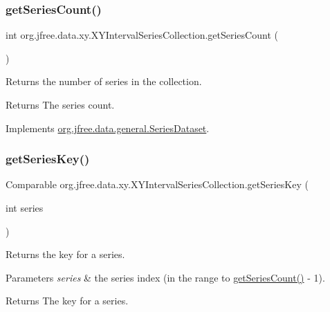 \subsubsection{\texorpdfstring{get\+Series\+Count()}{getSeriesCount()}}
{\footnotesize\ttfamily int org.\+jfree.\+data.\+xy.\+X\+Y\+Interval\+Series\+Collection.\+get\+Series\+Count (\begin{DoxyParamCaption}{ }\end{DoxyParamCaption})}

Returns the number of series in the collection.

\begin{DoxyReturn}{Returns}
The series count. 
\end{DoxyReturn}


Implements \mbox{\hyperlink{interfaceorg_1_1jfree_1_1data_1_1general_1_1_series_dataset_a84fe822f5918f941d9de1ed1b73c9f58}{org.\+jfree.\+data.\+general.\+Series\+Dataset}}.

\mbox{\label{classorg_1_1jfree_1_1data_1_1xy_1_1_x_y_interval_series_collection_a4d91349fc5532ee839dad049afe5126c}} 
\subsubsection{\texorpdfstring{get\+Series\+Key()}{getSeriesKey()}}
{\footnotesize\ttfamily Comparable org.\+jfree.\+data.\+xy.\+X\+Y\+Interval\+Series\+Collection.\+get\+Series\+Key (\begin{DoxyParamCaption}\item[{int}]{series }\end{DoxyParamCaption})}

Returns the key for a series.


\begin{DoxyParams}{Parameters}
{\em series} & the series index (in the range {} to {\ttfamily \mbox{\hyperlink{classorg_1_1jfree_1_1data_1_1xy_1_1_x_y_interval_series_collection_aae35bb3146172522ddd725598891b555}{get\+Series\+Count()}} -\/ 1}).\\
\hline
\end{DoxyParams}
\begin{DoxyReturn}{Returns}
The key for a series.
\end{DoxyReturn}

